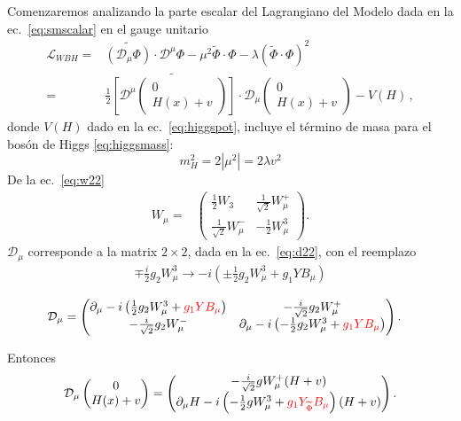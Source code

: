\begin{frame}
Comenzaremos analizando la parte escalar del Lagrangiano del Modelo dada en la ec.~\eqref{eq:smscalar} en el gauge unitario
\begin{align}
  \mathcal{L}_{WBH}
  =&\widetilde{\left( \mathcal{D}_\mu{\Phi} \right)}\cdot\mathcal{D}^\mu\Phi-\mu^2\widetilde{\Phi}\cdot\Phi-\lambda \left( \widetilde{\Phi}\cdot\Phi \right)^2 \nonumber\\
  =&\frac{1}{2}\widetilde{\left[\mathcal{D}^\mu \begin{pmatrix}
    0\\
    H(x)+v
  \end{pmatrix}\right]}\cdot \mathcal{D}_\mu\begin{pmatrix}
    0\\
    H(x)+v
  \end{pmatrix}-V(H)\,,
\end{align}
donde $V(H)$ dado en la ec.~\eqref{eq:higgspot}, incluye el término de masa para el bosón de Higgs \eqref{eq:higgsmass}:
\begin{equation}
  m_H^2=2\left|\mu^2\right|=2\lambda v^2
\end{equation}
De la ec.~\eqref{eq:w22}
\begin{align}
      W_\mu=&\begin{pmatrix}
    \frac{1}{2}W_3&\frac{1}{\sqrt{2}}W^+_\mu\\
    \frac{1}{\sqrt{2}}W^-_\mu&-\frac{1}{2}W^3_\mu
  \end{pmatrix}.
\end{align}
$\mathcal{D}_\mu$ corresponde a la matrix $2\times  2$, dada en la ec.~\eqref{eq:d22}, con el reemplazo
\begin{align}
\mp\frac{i}{2}g_2 W^3_\mu\to  -i\left(\pm\frac{1}{2}g_2 W^3_\mu+{g_1}Y B_\mu\right)
\end{align}

\begin{align}
  \label{eq:dercovsu2L}
 \mathcal{D}_\mu &=  \begin{pmatrix}
    \partial_\mu-i\left(\frac{1}{2}g_2 W^3_\mu+{\color{red}{g_1} Y B_\mu}\right)&-\frac{i}{\sqrt{2}}g_2 W^+_\mu\\
    -\frac{i}{\sqrt{2}}g_2 W^-_\mu&\partial_\mu-i\left(-\frac{1}{2}g_2 W^3_\mu+{\color{red}{g_1}Y B_\mu}\right)
  \end{pmatrix}.
\end{align}

Entonces
\begin{align}
\mathcal{D}_\mu \begin{pmatrix}
    0\\
    H(x)+v
  \end{pmatrix}=\begin{pmatrix}
    -\frac{i}{\sqrt{2}}gW_\mu^+(H+v)\\
    \partial_\mu H-i\left(-\frac{1}{2}gW^3_\mu+{\color{red}{g_1}Y_{\widetilde{\Phi}} B_\mu}\right)(H+v)
  \end{pmatrix}.
\end{align}


\end{frame}
